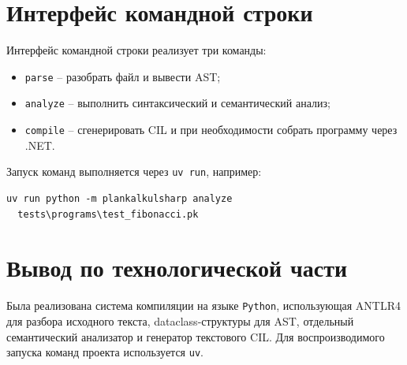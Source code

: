 \section{Интерфейс командной строки}
Интерфейс командной строки реализует три команды:
\begin{itemize}
	\item \texttt{parse} -- разобрать файл и вывести AST;
	\item \texttt{analyze} -- выполнить синтаксический и семантический анализ;
	\item \texttt{compile} -- сгенерировать CIL и при необходимости собрать программу через .NET.
\end{itemize}

Запуск команд выполняется через \texttt{uv run}, например:
\begin{verbatim}
uv run python -m plankalkulsharp analyze
  tests\programs\test_fibonacci.pk
\end{verbatim}

\section*{Вывод по технологической части}
Была реализована система компиляции на языке \texttt{Python}, использующая ANTLR4 для разбора исходного текста, dataclass-структуры для AST, отдельный семантический анализатор и генератор текстового CIL.
Для воспроизводимого запуска команд проекта используется \texttt{uv}.
